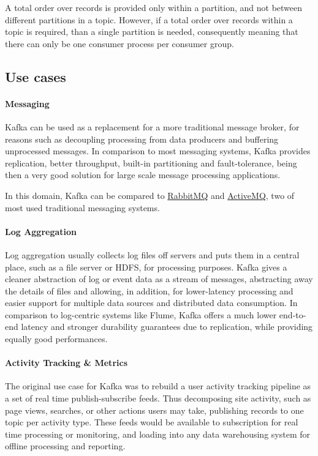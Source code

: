 A total order over records is provided only within a partition, and not between different partitions in a topic. However, if a total order over records within a topic is required, than a single partition is needed, consequently meaning that there can only be one consumer process per consumer group. 

\subsection{Use cases}

\paragraph{Messaging}

Kafka can be used as a replacement for a more traditional message broker, for reasons such as decoupling processing from data producers and buffering unprocessed messages. In comparison to most messaging systems, Kafka provides replication, better throughput, built-in partitioning and fault-tolerance, being then a very good solution for large scale message processing applications.

In this domain, Kafka can be compared to  \href{https://www.rabbitmq.com/}{RabbitMQ} and \href{http://activemq.apache.org/}{ActiveMQ}, two of most used traditional messaging systems.

\paragraph{Log Aggregation}

Log aggregation usually collects log files off servers and puts them in a central place, such as a file server or HDFS, for processing purposes. Kafka gives a cleaner abstraction of log or event data as a stream of messages, abstracting away the details of files and allowing, in addition, for lower-latency processing and easier support for multiple data sources and distributed data consumption. In comparison to log-centric systems like Flume, Kafka offers a much lower end-to-end latency and stronger durability guarantees due to replication, while providing equally good performances. 
 
\paragraph{Activity Tracking \& Metrics}

The original use case for Kafka was to rebuild a user activity tracking pipeline as a set of real time publish-subscribe feeds. Thus decomposing site activity, such as page views, searches, or other actions users may take, publishing records to one topic per activity type. These feeds would be available to subscription for real time processing or monitoring, and loading into any data warehousing system for offline processing and reporting.

